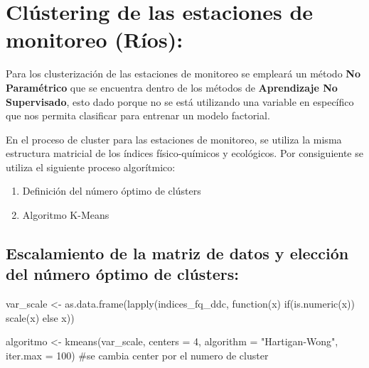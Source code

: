 \documentclass[
  10pt,
  letterpaper,
  DIV=11,
  numbers=noendperiod]{scrreprt}
\newenvironment{Shaded}{\begin{snugshade}}{\end{snugshade}}
\newcommand{\AttributeTok}[1]{\textcolor[rgb]{0.40,0.45,0.13}{#1}}
\newcommand{\CommentTok}[1]{\textcolor[rgb]{0.37,0.37,0.37}{#1}}
\newcommand{\ControlFlowTok}[1]{\textcolor[rgb]{0.00,0.23,0.31}{#1}}
\newcommand{\DecValTok}[1]{\textcolor[rgb]{0.68,0.00,0.00}{#1}}
\newcommand{\FunctionTok}[1]{\textcolor[rgb]{0.28,0.35,0.67}{#1}}
\newcommand{\NormalTok}[1]{\textcolor[rgb]{0.00,0.23,0.31}{#1}}
\newcommand{\OtherTok}[1]{\textcolor[rgb]{0.00,0.23,0.31}{#1}}
\newcommand{\StringTok}[1]{\textcolor[rgb]{0.13,0.47,0.30}{#1}}
\providecommand{\tightlist}{%
  \setlength{\itemsep}{0pt}\setlength{\parskip}{0pt}}\usepackage{longtable,booktabs,array}
\begin{document}
\hypertarget{cluxfastering-de-las-estaciones-de-monitoreo-ruxedos}{%
\chapter{Clústering de las estaciones de monitoreo
(Ríos):}\label{cluxfastering-de-las-estaciones-de-monitoreo-ruxedos}}

Para los clusterización de las estaciones de monitoreo se empleará un
método \textbf{No Paramétrico} que se encuentra dentro de los métodos de
\textbf{Aprendizaje No Supervisado}, esto dado porque no se está
utilizando una variable en específico que nos permita clasificar para
entrenar un modelo factorial.

En el proceso de cluster para las estaciones de monitoreo, se utiliza la
misma estructura matricial de los índices físico-químicos y ecológicos.
Por consiguiente se utiliza el siguiente proceso algorítmico:

\begin{enumerate}
\def\labelenumi{\arabic{enumi}.}
\tightlist
\item
  Definición del número óptimo de clústers
\item
  Algoritmo K-Means
\end{enumerate}

\hypertarget{escalamiento-de-la-matriz-de-datos-y-elecciuxf3n-del-nuxfamero-uxf3ptimo-de-cluxfasters}{%
\section{Escalamiento de la matriz de datos y elección del número óptimo
de
clústers:}\label{escalamiento-de-la-matriz-de-datos-y-elecciuxf3n-del-nuxfamero-uxf3ptimo-de-cluxfasters}}

\begin{Shaded}
\begin{Highlighting}[numbers=left,,]
\NormalTok{var\_scale }\OtherTok{\textless{}{-}} \FunctionTok{as.data.frame}\NormalTok{(}\FunctionTok{lapply}\NormalTok{(indices\_fq\_ddc, }\ControlFlowTok{function}\NormalTok{(x) }\ControlFlowTok{if}\NormalTok{(}\FunctionTok{is.numeric}\NormalTok{(x)) }\FunctionTok{scale}\NormalTok{(x) }\ControlFlowTok{else}\NormalTok{ x))}

\NormalTok{algoritmo }\OtherTok{\textless{}{-}} \FunctionTok{kmeans}\NormalTok{(var\_scale,}
             \AttributeTok{centers =} \DecValTok{4}\NormalTok{,}
             \AttributeTok{algorithm =} \StringTok{"Hartigan{-}Wong"}\NormalTok{,}
             \AttributeTok{iter.max =} \DecValTok{100}\NormalTok{) }\CommentTok{\#se cambia center por el numero de cluster}
\end{Highlighting}
\end{Shaded}
\end{document}
